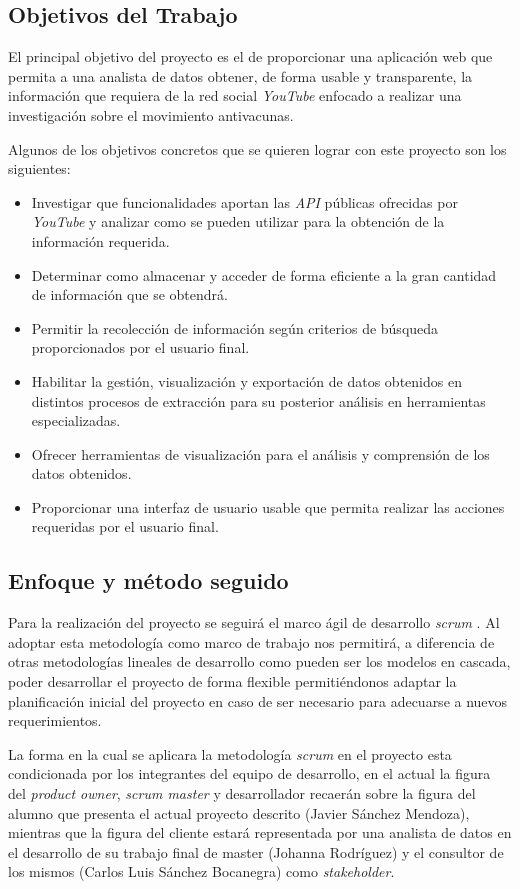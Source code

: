 \documentclass[11pt,a4paper]{article}
\begin{document}
\subsection{Objetivos del Trabajo}
El principal objetivo del proyecto es el de proporcionar una aplicación web que permita a una analista de datos obtener, de forma usable y transparente, la información que requiera de la red social \textit{YouTube} enfocado a realizar una investigación sobre el movimiento antivacunas.

Algunos de los objetivos concretos que se quieren lograr con este proyecto son los siguientes: 

\begin{itemize}
\item Investigar que funcionalidades aportan las \textit{API} públicas ofrecidas por \textit{YouTube} y analizar como se pueden utilizar para la obtención de la información requerida.
\item Determinar como almacenar y acceder de forma eficiente a la gran cantidad de información que se obtendrá.
\item Permitir la recolección de información según criterios de búsqueda proporcionados por el usuario final.
\item Habilitar la gestión, visualización y exportación de datos obtenidos en distintos procesos de extracción para su posterior análisis en herramientas especializadas.
\item Ofrecer herramientas de visualización para el análisis y comprensión de los datos obtenidos.
\item Proporcionar una interfaz de usuario usable que permita realizar las acciones requeridas por el usuario final.
\end{itemize}

\subsection{Enfoque y método seguido}
Para la realización del proyecto se seguirá el marco ágil de desarrollo \textit{scrum} \cite{8}. Al adoptar esta metodología como marco de trabajo nos permitirá, a diferencia de otras metodologías lineales de desarrollo como pueden ser los modelos en cascada, poder desarrollar el proyecto de forma flexible permitiéndonos adaptar la planificación inicial del proyecto en caso de ser necesario para adecuarse a nuevos requerimientos.

La forma en la cual se aplicara la metodología \textit{scrum} en el proyecto esta condicionada por los integrantes del equipo de desarrollo, en el actual la figura del \textit{product owner}, \textit{scrum master} y desarrollador recaerán sobre la figura del alumno que presenta el actual proyecto descrito (Javier Sánchez Mendoza), mientras que la figura del cliente estará representada por una analista de datos en el desarrollo de su trabajo final de master (Johanna Rodríguez) y el consultor de los mismos (Carlos Luis Sánchez Bocanegra) como \textit{stakeholder}.
\end{document}
